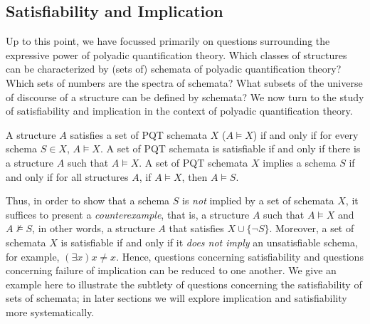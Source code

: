 \subsection{Satisfiability and Implication}

Up to this point, we have focussed primarily on questions surrounding the expressive power of polyadic quantification theory. Which classes of structures can be characterized by (sets of) schemata of polyadic quantification theory? Which sets of numbers are the spectra of schemata? What subsets of the universe of discourse of a structure can be defined by schemata? We now turn to the study of satisfiability and implication in the context of polyadic quantification theory. 
\begin{definition}\label{sat-imp-def}
A structure $A$ satisfies a set of PQT schemata $X$ ($A\models X$) if and only if for every schema $S\in X$, $A\models X$. A set of PQT schemata is satisfiable if and only if there is a structure $A$ such that $A\models X$. A set of PQT schemata $X$ implies a schema $S$ if and only if for all structures $A$, if $A\models X$, then $A\models S$.
\end{definition}
 Thus, in order to show that a schema $S$ is \emph{not} implied by a set of schemata $X$, it suffices to present a \emph{counterexample}, that is, a structure $A$ such that $A\models X$ and $A\not\models S$, in other words, a structure $A$ that satisfies $X\cup\{\neg S\}$. Moreover, a set of schemata $X$ is satisfiable if and only if it \emph{does not imply} an unsatisfiable schema, for example, $(\exists x)x\neq x$. Hence, questions concerning satisfiability and questions concerning failure of implication can be reduced to one another. 
 We give an example here to illustrate the subtlety of questions concerning the satisfiability of sets of schemata; in later sections we will explore implication and satisfiability more systematically.
 
